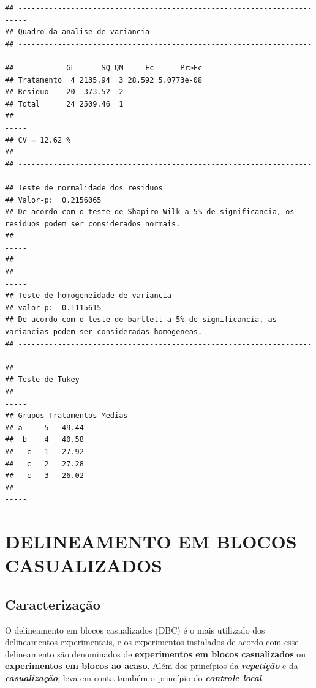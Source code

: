 \documentclass[
]{book}
\begin{document}
\begin{verbatim}
## ------------------------------------------------------------------------
## Quadro da analise de variancia
## ------------------------------------------------------------------------
##            GL      SQ QM     Fc      Pr>Fc
## Tratamento  4 2135.94  3 28.592 5.0773e-08
## Residuo    20  373.52  2                  
## Total      24 2509.46  1                  
## ------------------------------------------------------------------------
## CV = 12.62 %
## 
## ------------------------------------------------------------------------
## Teste de normalidade dos residuos 
## Valor-p:  0.2156065 
## De acordo com o teste de Shapiro-Wilk a 5% de significancia, os residuos podem ser considerados normais.
## ------------------------------------------------------------------------
## 
## ------------------------------------------------------------------------
## Teste de homogeneidade de variancia 
## valor-p:  0.1115615 
## De acordo com o teste de bartlett a 5% de significancia, as variancias podem ser consideradas homogeneas.
## ------------------------------------------------------------------------
## 
## Teste de Tukey
## ------------------------------------------------------------------------
## Grupos Tratamentos Medias
## a     5   49.44 
##  b    4   40.58 
##   c   1   27.92 
##   c   2   27.28 
##   c   3   26.02 
## ------------------------------------------------------------------------
\end{verbatim}

\hypertarget{delineamento-em-blocos-casualizados}{%
\chapter{DELINEAMENTO EM BLOCOS CASUALIZADOS}\label{delineamento-em-blocos-casualizados}}

\hypertarget{caracterizauxe7uxe3o-1}{%
\section{Caracterização}\label{caracterizauxe7uxe3o-1}}

O delineamento em blocos casualizados (DBC) é o mais utilizado dos delineamentos experimentais, e os experimentos instalados de acordo com esse delineamento são denominados de \textbf{experimentos em blocos casualizados} ou \textbf{experimentos em blocos ao acaso}. Além dos princípios da \textbf{\emph{repetição}} e da \textbf{\emph{casualização}}, leva em conta também o princípio do \textbf{\emph{controle local}}.
\end{document}
